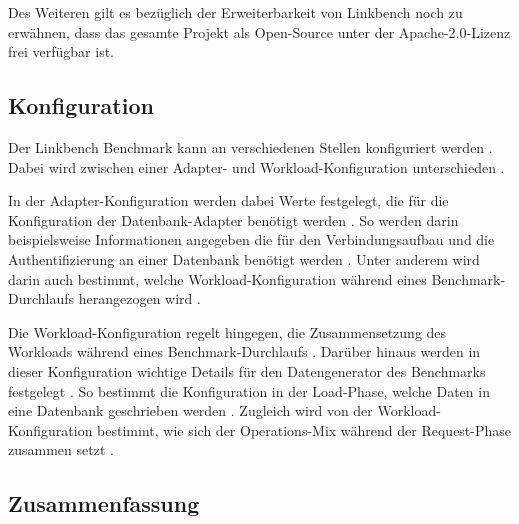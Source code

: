 Des Weiteren gilt es bezüglich der Erweiterbarkeit von Linkbench noch zu erwähnen, dass das gesamte Projekt als Open-Source unter der Apache-2.0-Lizenz frei verfügbar ist.

\subsection{Konfiguration}
Der Linkbench Benchmark kann an verschiedenen Stellen konfiguriert werden \cite{linkbench_paper,fb_linkbench_github}. Dabei wird zwischen einer Adapter- und Workload-Konfiguration unterschieden \cite{fb_linkbench_github}. 

In der Adapter-Konfiguration werden dabei Werte festgelegt, die für die Konfiguration der Datenbank-Adapter benötigt werden \cite{fb_linkbench_github}. So werden darin beispielsweise Informationen angegeben die für den Verbindungsaufbau und die Authentifizierung an einer Datenbank benötigt werden \cite{fb_linkbench_github}. Unter anderem wird darin auch bestimmt, welche Workload-Konfiguration während eines Benchmark-Durchlaufs herangezogen wird \cite{fb_linkbench_github}. 

Die Workload-Konfiguration regelt hingegen, die Zusammensetzung des Workloads während eines Benchmark-Durchlaufs \cite{fb_linkbench_github}. Darüber hinaus werden in dieser Konfiguration wichtige Details für den Datengenerator des Benchmarks festgelegt \cite{fb_linkbench_github}. So bestimmt die Konfiguration in der Load-Phase, welche Daten in eine Datenbank geschrieben werden \cite{fb_linkbench_github}. Zugleich wird von der Workload-Konfiguration bestimmt, wie sich der Operations-Mix während der Request-Phase zusammen setzt \cite{fb_linkbench_github}.  

\subsection{Zusammenfassung}
